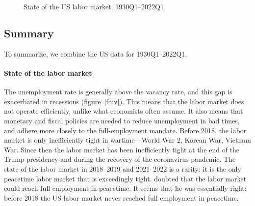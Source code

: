 \documentclass[letterpaper,12pt,leqno]{article}
\newcommand{\pdf}{../../figures/xsquareroot_202206.pdf}
\begin{document}
\newlength{\imageheight}
\begin{figure}[p]
\vfig
{}\vfig
{}
\caption{State of the US labor market, 1930Q1--2022Q1}
\label{f:summary}\end{figure}

\subsection{Summary}

To summarize, we combine the US data for 1930Q1--2022Q1.

\paragraph{State of the labor market} The unemployment rate is generally above the vacancy rate, and this gap is exacerbated in recessions (figure~\ref{f:uv}). This means that the labor market does not operate efficiently, unlike what economists often assume. It also means that monetary and fiscal policies are needed to reduce unemployment in bad times, and adhere more closely to the full-employment mandate. Before 2018, the labor market is only inefficiently tight in wartime---World War 2, Korean War, Vietnam War. Since then the labor market has been inefficiently tight at the end of the Trump presidency and during the recovery of the coronavirus pandemic. The state of the labor market in 2018--2019 and 2021--2022 is a rarity: it is the only peacetime labor market that is exceedingly tight. \citet[p. 322]{K36} doubted that the labor market could reach full employment in peacetime. It seems that he was essentially right: before 2018 the US labor market never reached full employment in peacetime.
\end{document}
